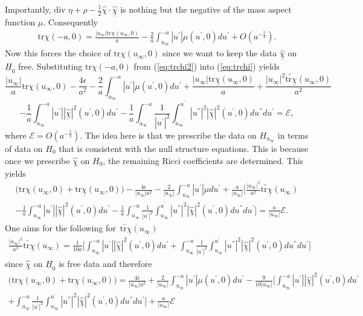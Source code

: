 \documentclass{amsart}
\newcommand{\Hbar}{\underline{H}}
\newcommand{\chihat}{\hat{\chi}}
\newcommand{\chibar}{\underline{\chi}}
\newcommand{\chibarhat}{\underline{\hat{\chi}}}
\renewcommand{\div}{\mbox{div }}
\newcommand{\tr}{\mbox{tr}}
\begin{document}
Importantly, $\div\eta+\rho-\frac{1}{2}\chihat\cdot\chibarhat$ is nothing but the negative of the mass aspect function $\mu$. Consequently 
\begin{align}
\tr\chi(-a,0)=\frac{|u_{\infty}|\tr\chi(u_{\infty},0)}{a}-\frac{2}{a} \int_{u_{\infty}}^{-a}|u^{'}|\mu(u^{'},0) du^{'}+O(a^{-\frac{5}{2}}).   
\end{align}
Now this forces the choice of $\tr\chi(u_{\infty},0)$ since we want to keep the data $\chibarhat$ on $\Hbar_{0}$ free. Substituting $\tr\chi(-a,0)$ from (\ref{eq:trchi2}) into (\ref{eq:trchi}) yields
\[
\frac{|u_{\infty}|}{a}\tr\chi(u_{\infty},0)-\frac{4\epsilon}{a^{2}}-\frac{2}{a} \int_{u_{\infty}}^{-a}|u^{'}|\mu(u^{'},0) du^{'} +\frac{|u_{\infty}|\tr\chibar(u_{\infty},0)}{a}+\frac{|u_{\infty}|^{2}\widetilde{\tr\chibar}(u_{\infty},0)}{a^{2}}
\]\[-\frac{1}{a}\int_{u_{\infty}}^{-a}|u^{'}||\chibarhat|^{2}(u^{'},0)du^{'}-\frac{1}{a}\int_{u_{\infty}}^{-a}\frac{1}{|u^{'}|^{2}}\int_{u_{\infty}}^{u^{'}}|u^{''}|^{2}|\chibarhat|^{2}(u^{'},0)du^{''}du^{'}=\mathscr{E},
\]
where $\mathscr{E}=O(a^{-\frac{5}{2}})$.
The idea here is that we prescribe the data on $H_{u_{\infty}}$ in terms of data on $H_{0}$ that is consistent with the null structure equations. This is because once we prescribe $\chibarhat$ on $H_{0}$, the remaining Ricci coefficients are determined. This yields 
\begin{align}
 \bigg(\tr\chi(u_{\infty},0)+\tr\chibar(u_{\infty},0)\bigg)-\frac{4\epsilon}{|u_{\infty}|a^{2}}-\frac{2}{|u_{\infty}|}\int_{u_{\infty}}^{-a}|u^{'}|\mu du^{'}+\frac{a}{|u_{\infty}|}\bigg[\frac{|u_{\infty}|^{2}}{a^{2}}\widetilde{\tr\chibar}(u_{\infty})\\
 -\frac{1}{a}\int_{u_{\infty}}^{-a}|u^{'}||\chibarhat|^{2}(u^{'},0)du^{'}-\frac{1}{a}\int_{u_{\infty}}^{-a}\frac{1}{|u^{'}|^{2}}\int_{u_{\infty}}^{u^{'}}|u^{''}|^{2}|\chibarhat|^{2}(u^{'},0)du^{''}du^{'}\bigg]=\frac{a}{|u_{\infty}|}\mathscr{E}.
\end{align}
One aims for the following for $\widetilde{\tr\chibar}(u_{\infty})$
\begin{align}
\frac{|u_{\infty}|^{2}}{a^{2}}\widetilde{\tr\chibar}(u_{\infty})=\frac{1}{10a}\bigg[\int_{u_{\infty}}^{-a}|u^{'}||\chibarhat|^{2}(u^{'},0)du^{'}+\int_{u_{\infty}}^{-a}\frac{1}{|u^{'}|^{2}}\int_{u_{\infty}}^{u^{'}}|u^{''}|^{2}|\chibarhat|^{2}(u^{'},0)du^{''}du^{'} \bigg]    
\end{align}
since $\chibarhat$ on $\Hbar_{0}$ is free data and therefore 
\begin{align}
\bigg(\tr\chi(u_{\infty},0)+\tr\chibar(u_{\infty},0)\bigg)=\frac{4\epsilon}{|u_{\infty}|a^{2}}+\frac{2}{|u_{\infty}|}\int_{u_{\infty}}^{-a}|u^{'}|\mu (u^{'},0)du^{'}-\frac{9}{10|u_{\infty}|}\bigg[\int_{u_{\infty}}^{-a}|u^{'}||\chibarhat|^{2}(u^{'},0)du^{'}\\\nonumber +\int_{u_{\infty}}^{-a}\frac{1}{|u^{'}|^{2}}\int_{u_{\infty}}^{u^{'}}|u^{''}|^{2}|\chibarhat|^{2}(u^{'},0)du^{''}du^{'} \bigg]+\frac{a}{|u_{\infty}|}\mathscr{E}   
\end{align}
\end{document}

